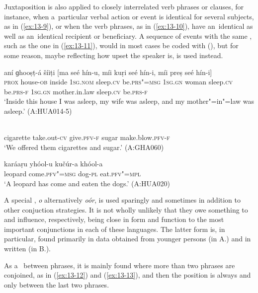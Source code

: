 Juxtaposition is also applied to closely interrelated verb phrases or clauses, for instance, when a~particular verbal action or event is identical for several subjects, as in (\ref{ex:13-9}), or when the verb phrases, as in (\ref{ex:13-10}), have an~identical  as well as an~identical recipient or beneficiary. A sequence of events with the same , such as the one in (\ref{ex:13-11}), would in most cases be coded with  (), but for some reason, maybe reflecting how upset the speaker is,  is used instead.

\begin{exe}
\ex
\label{ex:13-9}
\gll aní ɡhooṣṭ-á šíiṭi [ma seé hín-u, míi kuṛi seé hín-i, míi preṣ seé hín-i] \\
\textsc{prox} house-\textsc{ob} inside \textsc{1sg.nom} sleep.\textsc{cv} be.\textsc{prs"=msg}  \textsc{1sg.gn} woman sleep.\textsc{cv} be.\textsc{prs-f } \textsc{1sg.gn} mother.in.law sleep.\textsc{cv} be.\textsc{prs-f} \\
\glt `Inside this house I was asleep, my wife was asleep, and my mother"=in"=law was asleep.' (A:HUA014-5)

\ex
\label{ex:13-10}
  \\
cigarette take.out-\textsc{cv} give.\textsc{pfv-f} sugar make.blow.\textsc{pfv-f} \\
\glt `We offered them cigarettes and sugar.' (A:GHA060)

\ex
\label{ex:13-11}
\gll karáaṛu yhóol-u kučúr-a khóol-a  \\
leopard come.\textsc{pfv"=msg} dog-\textsc{pl} eat.\textsc{pfv"=mpl} \\
\glt `A leopard has come and eaten the dogs.' (A:HUA020) 
\end{exe}

 A special , \textit{o} alternatively \textit{oór}, is used sparingly and sometimes in addition to other conjuction strategies. It is not wholly unlikely that they owe something to  and  influence, respectively, being close in form and function to the most important conjunctions in each of these languages. The latter form is, in particular, found primarily in data obtained from younger persons (in A.) and in written  (in B.). 


As a~ between  phrases, it is mainly found where more than two  phrases are conjoined, as in (\ref{ex:13-12}) and (\ref{ex:13-13}), and then the position is always and only between the last two phrases.

